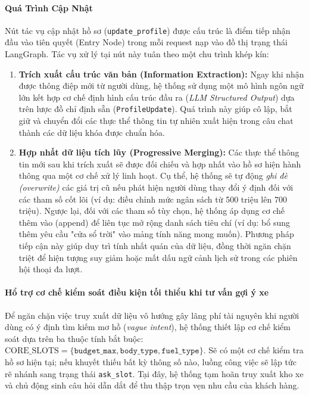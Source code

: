 \paragraph{Quá Trình Cập Nhật}

Nút tác vụ cập nhật hồ sơ (\texttt{update\_profile}) được cấu trúc là điểm tiếp nhận đầu vào tiên quyết (Entry Node) trong mỗi request nạp vào đồ thị trạng thái LangGraph. Tác vụ xử lý tại nút này tuân theo một chu trình khép kín:

\begin{enumerate}
    \item \textbf{Trích xuất cấu trúc văn bản (Information Extraction):} Ngay khi nhận được thông điệp mới từ người dùng, hệ thống sử dụng một mô hình ngôn ngữ lớn kết hợp cơ chế định hình cấu trúc đầu ra (\textit{LLM Structured Output}) dựa trên lược đồ chỉ định sẵn (\texttt{ProfileUpdate}). Quá trình này giúp cô lập, bắt giữ và chuyển đổi các thực thể thông tin tự nhiên xuất hiện trong câu chat thành các dữ liệu khóa được chuẩn hóa.
    
    \item \textbf{Hợp nhất dữ liệu tích lũy (Progressive Merging):} Các thực thể thông tin mới sau khi trích xuất sẽ được đối chiếu và hợp nhất vào hồ sơ hiện hành thông qua một cơ chế xử lý linh hoạt. Cụ thể, hệ thống sẽ tự động \textit{ghi đè (overwrite)} các giá trị cũ nếu phát hiện người dùng thay đổi ý định đối với các tham số cốt lõi (ví dụ: điều chỉnh mức ngân sách từ 500 triệu lên 700 triệu). Ngược lại, đối với các tham số tùy chọn, hệ thống áp dụng cơ chế thêm vào {(append)} để liên tục mở rộng danh sách tiêu chí (ví dụ: bổ sung thêm yêu cầu "cửa sổ trời" vào mảng tính năng mong muốn). Phương pháp tiếp cận này giúp duy trì tính nhất quán của dữ liệu, đồng thời ngăn chặn triệt để hiện tượng suy giảm hoặc mất dấu ngữ cảnh lịch sử trong các phiên hội thoại đa lượt.
\end{enumerate}

\paragraph{Hổ trợ cơ chế kiểm soát điều kiện tối thiểu khi tư vấn gợi ý xe}

Để ngăn chặn việc truy xuất dữ liệu vô hướng gây lãng phí tài nguyên khi người dùng có ý định tìm kiếm mơ hồ (\textit{vague intent}), hệ thống thiết lập cơ chế kiểm soát dựa trên ba thuộc tính bắt buộc: $\text{CORE\_SLOTS} = \{\texttt{budget\_max}, \texttt{body\_type}, \texttt{fuel\_type}\}$. Sẽ có một cơ chế kiểm tra hồ sơ hiện tại; nếu khuyết thiếu bất kỳ thông số nào, luồng công việc sẽ lập tức rẽ nhánh sang trạng thái \texttt{ask\_slot}. Tại đây, hệ thống tạm hoãn truy xuất kho xe và chủ động sinh câu hỏi dẫn dắt để thu thập trọn vẹn nhu cầu của khách hàng.


